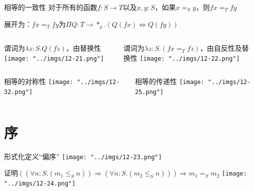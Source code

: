 \documentclass[UTF8,aspectratio=169,mathserif]{beamer}
\begin{document}
		\begin{frame}[shrink]
			\begin{block}{相等的一致性}
				对于所有的函数$f:S\rightarrow T$以及$x,y:S$，如果$x=_Sy$，则$fx=_Tfy$
				
				展开为：$fx=_T fy$为$\Pi Q:T\rightarrow*_p.(Q(fx)\Leftrightarrow Q(fy))$
			\end{block}
		
			\begin{columns}
				\begin{column}{0.47\textwidth}
					\begin{block}{谓词为$\lambda z:S.Q(fz)$，由替换性}
						\texttt{[image: "../imgs/12-21.png"]}
					\end{block}
				\end{column}
				\begin{column}{0.53\textwidth}
					\begin{block}{谓词为$\lambda z:S.(fx=_T fz)$，由自反性及替换性}
						\texttt{[image: "../imgs/12-22.png"]}
					\end{block}
				\end{column}
			\end{columns}
		\end{frame}
	
		\begin{frame}[shrink]
			\begin{columns}
				\begin{column}{0.5\textwidth}
					\begin{block}{相等的对称性}
						\texttt{[image: "../imgs/12-32.png"]}
					\end{block}
				\end{column}
				\begin{column}{0.5\textwidth}
					\begin{block}{相等的传递性}
						\texttt{[image: "../imgs/12-25.png"]}
					\end{block}
				\end{column}
			\end{columns}
		\end{frame}
	
	\section{序}
		\begin{frame}{形式化定义“偏序”}
			\texttt{[image: "../imgs/12-23.png"]}
		\end{frame}
	
		\begin{frame}[shrink]{证明$((\forall n:S.(m_1\le_S n))\Rightarrow(\forall n:S.(m_2\le_S n)))\Rightarrow m_1=_S m_2$}
			\texttt{[image: "../imgs/12-24.png"]}
		\end{frame}
\end{document}
